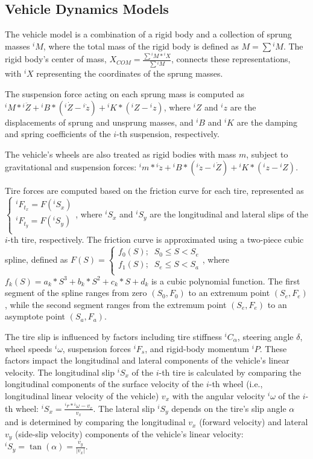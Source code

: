 \documentclass[letterpaper, 10 pt, conference]{ieeeconf}  %
\begin{document}
\subsection{Vehicle Dynamics Models}
\label{Sub-Section: Vehicle Dynamics Models}

The vehicle model is a combination of a rigid body and a collection of sprung masses $^iM$, where the total mass of the rigid body is defined as $M=\sum{^iM}$. The rigid body's center of mass, $X_{COM} = \frac{\sum{{^iM}*{^iX}}}{\sum{^iM}}$, connects these representations, with $^iX$ representing the coordinates of the sprung masses.

The suspension force acting on each sprung mass is computed as ${^iM} * {^i{\ddot{Z}}} + {^iB} * ({^i{\dot{Z}}}-{^i{\dot{z}}}) + {^iK} * ({^i{Z}}-{^i{z}})$, where $^iZ$ and $^iz$ are the displacements of sprung and unsprung masses, and $^iB$ and $^iK$ are the damping and spring coefficients of the $i$-th suspension, respectively.

The vehicle's wheels are also treated as rigid bodies with mass $m$, subject to gravitational and suspension forces: ${^im} * {^i{\ddot{z}}} + {^iB} * ({^i{\dot{z}}}-{^i{\dot{Z}}}) + {^iK} * ({^i{z}}-{^i{Z}})$.

Tire forces are computed based on the friction curve for each tire, represented as $\left\{\begin{matrix} {^iF_{t_x}} = F(^iS_x) \\{^iF_{t_y}} = F(^iS_y) \\ \end{matrix}\right.$, where $^iS_x$ and $^iS_y$ are the longitudinal and lateral slips of the $i$-th tire, respectively. The friction curve is approximated using a two-piece cubic spline, defined as $F(S) = \left\{\begin{matrix} f_0(S); \;\; S_0 \leq S < S_e \\ f_1(S); \;\; S_e \leq S < S_a \\ \end{matrix}\right.$, where $f_k(S) = a_k*S^3+b_k*S^2+c_k*S+d_k$ is a cubic polynomial function. The first segment of the spline ranges from zero $(S_0,F_0)$ to an extremum point $(S_e,F_e)$, while the second segment ranges from the extremum point $(S_e, F_e)$ to an asymptote point $(S_a, F_a)$.

The tire slip is influenced by factors including tire stiffness $^iC_\alpha$, steering angle $\delta$, wheel speeds $^i\omega$, suspension forces $^iF_s$, and rigid-body momentum $^iP$. These factors impact the longitudinal and lateral components of the vehicle's linear velocity. The longitudinal slip $^iS_x$ of the $i$-th tire is calculated by comparing the longitudinal components of the surface velocity of the $i$-th wheel (i.e., longitudinal linear velocity of the vehicle) $v_x$ with the angular velocity $^i\omega$ of the $i$-th wheel: ${^iS_x} = \frac{{^ir}*{^i\omega}-v_x}{v_x}$. The lateral slip $^iS_y$ depends on the tire's slip angle $\alpha$ and is determined by comparing the longitudinal $v_x$ (forward velocity) and lateral $v_y$ (side-slip velocity) components of the vehicle's linear velocity: ${^iS_y} = \tan(\alpha) = \frac{v_y}{\left| v_x \right|}$.
\end{document}
